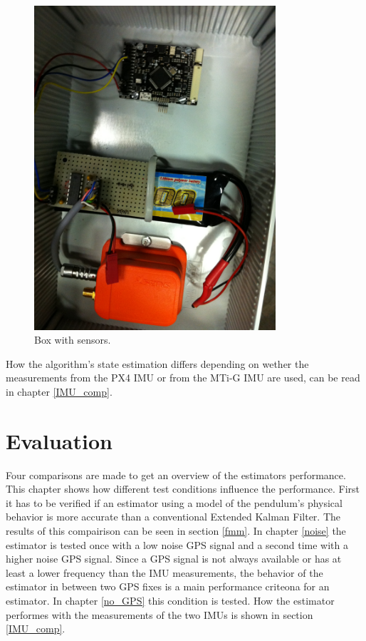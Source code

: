\begin{figure}[h]
\centering
\includegraphics[width=0.8\textwidth]{vicon_bilder/IMG_0130.JPG}
\caption{Box with sensors.}
\label{box_setup}
\end{figure}
How the algorithm's state estimation differs depending on wether the measurements from the PX4 IMU or from the MTi-G IMU are used, can be read in chapter \ref{IMU_comp}.



\section{Evaluation}\label{evaluation}
Four comparisons are made to get an overview of the estimators performance. This chapter shows how different test conditions influence the performance. First it has to be verified if an estimator using a model of the pendulum's physical behavior is more accurate than a conventional Extended Kalman Filter. The results of this compairison can be seen in section \ref{fmm}. In chapter \ref{noise} the estimator is tested once with a low noise GPS signal and a second time with a higher noise GPS signal. Since a GPS signal is not always available or has at least a lower frequency than the IMU measurements, the behavior of the estimator in between two GPS fixes is a main performance criteona for an estimator. In chapter \ref{no_GPS} this condition is tested. How the estimator performes with the measurements of the two IMUs is shown in section \ref{IMU_comp}. 

